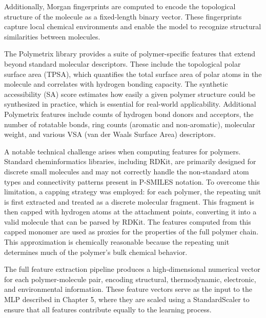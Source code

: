 Additionally, Morgan fingerprints are computed to encode the topological structure of the molecule as a fixed-length binary vector. These fingerprints capture local chemical environments and enable the model to recognize structural similarities between molecules.

The Polymetrix library provides a suite of polymer-specific features that extend beyond standard molecular descriptors. These include the topological polar surface area (TPSA), which quantifies the total surface area of polar atoms in the molecule and correlates with hydrogen bonding capacity. The synthetic accessibility (SA) score estimates how easily a given polymer structure could be synthesized in practice, which is essential for real-world applicability. Additional Polymetrix features include counts of hydrogen bond donors and acceptors, the number of rotatable bonds, ring counts (aromatic and non-aromatic), molecular weight, and various VSA (van der Waals Surface Area) descriptors.

A notable technical challenge arises when computing features for polymers. Standard cheminformatics libraries, including RDKit, are primarily designed for discrete small molecules and may not correctly handle the non-standard atom types and connectivity patterns present in P-SMILES notation. To overcome this limitation, a capping strategy was employed: for each polymer, the repeating unit is first extracted and treated as a discrete molecular fragment. This fragment is then capped with hydrogen atoms at the attachment points, converting it into a valid molecule that can be parsed by RDKit. The features computed from this capped monomer are used as proxies for the properties of the full polymer chain. This approximation is chemically reasonable because the repeating unit determines much of the polymer's bulk chemical behavior.

The full feature extraction pipeline produces a high-dimensional numerical vector for each polymer-molecule pair, encoding structural, thermodynamic, electronic, and environmental information. These feature vectors serve as the input to the MLP described in Chapter 5, where they are scaled using a StandardScaler to ensure that all features contribute equally to the learning process.
